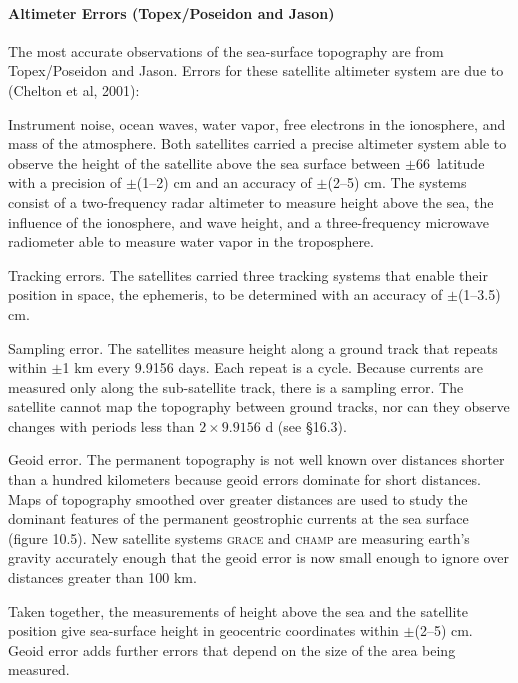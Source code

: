 \vspace{-1ex}

\paragraph{Altimeter Errors (Topex/Poseidon and Jason)}
The most
accurate observations of the sea-surface topography are from
Topex/Poseidon and Jason. Errors for these satellite
altimeter system are due to (Chelton et al, 2001):
\begin{enumerate}
\vitem Instrument noise, ocean waves, water vapor, free electrons in
the ionosphere, and mass of the atmosphere. Both satellites carried a
precise altimeter system able to observe the height of the satellite
above the sea surface between $\pm$66\degrees\ latitude with a
precision of $\pm$(1--2) cm and an accuracy
of $\pm$(2--5) cm. The systems consist of a two-frequency radar
altimeter to measure height above the sea, the influence of the
ionosphere, and wave height, and a three-frequency microwave
radiometer able to measure water vapor in the troposphere.

\vitem Tracking errors. The satellites carried three tracking systems
that enable their position in space, the ephemeris, to be determined
with an accuracy of
$\pm$(1--3.5) cm.

\vitem Sampling error. The satellites measure height along a ground
track that repeats within $\pm$1 km every 9.9156 days. Each repeat is
a cycle. Because currents are measured only along the sub-satellite
track, there is a sampling error. The satellite
cannot map the topography between ground tracks, nor can they observe
changes with periods less than $2 \times 9.9156$ d (see \S 16.3).

\vitem Geoid error. The permanent topography is
not well known over distances shorter than a hundred kilometers
because geoid errors dominate for short distances. Maps of topography
smoothed over greater distances are used to study the dominant
features of the permanent geostroph\-ic currents at the sea surface
(figure 10.5). New satellite systems \textsc{grace} and
\textsc{champ} are measuring earth's gravity accurately enough
 that the geoid error is now small enough to
ignore over distances greater than 100 km.
\end{enumerate}
Taken together, the measurements of height above the sea and the
satellite position give sea-surface height in geocentric coordinates
within $\pm$(2--5) cm. Geoid error adds further errors that depend on
the size of the area being measured.


